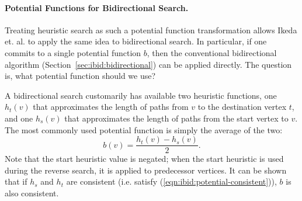 \paragraph{Potential Functions for Bidirectional Search.}
Treating heuristic search as such a potential function transformation
allows Ikeda et. al. \citep{ikeda1994betterroutes} to apply
the same idea to bidirectional search.
In particular,
if one commits to a single potential function $b$,
then the conventional bidirectional algorithm
(Section~\ref{sec:ibid:bidirectional})
can be applied directly.
The question is,
what potential function should we use?

A bidirectional search customarily has available
two heuristic functions,
one $h_t(v)$ that approximates the length of paths
from $v$ to the destination vertex $t$,
and one $h_s(v)$ that approximates the length of paths
from the start vertex to $v$.
The most commonly used potential function
\citep{ikeda1994betterroutes, goldberg2005spexternalmemory}
is simply the average of the two:
\begin{equation}
   b(v) = \frac{h_t(v) - h_s(v)}{2}.
   \label{eqn:ibid:averaged-potential}
\end{equation}
Note that the start heuristic value is negated;
when the start heuristic is used during the reverse search,
it is applied to predecessor vertices.
It can be shown that if $h_s$ and $h_t$ are consistent
(i.e. satisfy (\ref{eqn:ibid:potential-consistent})),
$b$ is also consistent.

